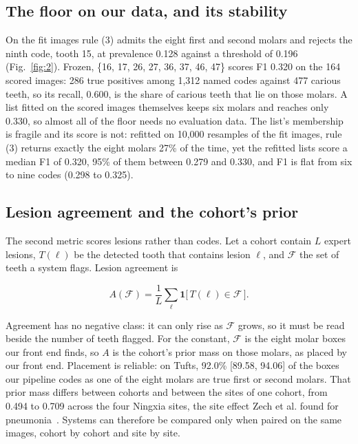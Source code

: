 \documentclass[conference]{IEEEtran}
\begin{document}
\subsection{The floor on our data, and its stability}

On the fit images rule (3) admits the eight first and second molars and rejects the ninth code, tooth 15, at prevalence 0.128 against a threshold of 0.196 (Fig.~\ref{fig:2}). Frozen, \{16, 17, 26, 27, 36, 37, 46, 47\} scores F1 0.320 on the 164 scored images: 286 true positives among 1,312 named codes against 477 carious teeth, so its recall, 0.600, is the share of carious teeth that lie on those molars. A list fitted on the scored images themselves keeps six molars and reaches only 0.330, so almost all of the floor needs no evaluation data. The list's membership is fragile and its score is not: refitted on 10,000 resamples of the fit images, rule (3) returns exactly the eight molars 27\% of the time, yet the refitted lists score a median F1 of 0.320, 95\% of them between 0.279 and 0.330, and F1 is flat from six to nine codes (0.298 to 0.325).

\subsection{Lesion agreement and the cohort's prior}

The second metric scores lesions rather than codes. Let a cohort contain $L$ expert lesions, $T(\ell)$ be the detected tooth that contains lesion $\ell$, and $\mathcal{F}$ the set of teeth a system flags. Lesion agreement is

\begin{equation}
A(\mathcal{F}) = \frac{1}{L} \sum_{\ell} \mathbf{1}\big[\, T(\ell) \in \mathcal{F} \,\big].
\end{equation}

Agreement has no negative class: it can only rise as $\mathcal{F}$ grows, so it must be read beside the number of teeth flagged. For the constant, $\mathcal{F}$ is the eight molar boxes our front end finds, so $A$ is the cohort's prior mass on those molars, as placed by our front end. Placement is reliable: on Tufts, 92.0\% [89.58, 94.06] of the boxes our pipeline codes as one of the eight molars are true first or second molars. That prior mass differs between cohorts and between the sites of one cohort, from 0.494 to 0.709 across the four Ningxia sites, the site effect Zech et al. found for pneumonia~\cite{zech2018variable}. Systems can therefore be compared only when paired on the same images, cohort by cohort and site by site.
\end{document}
